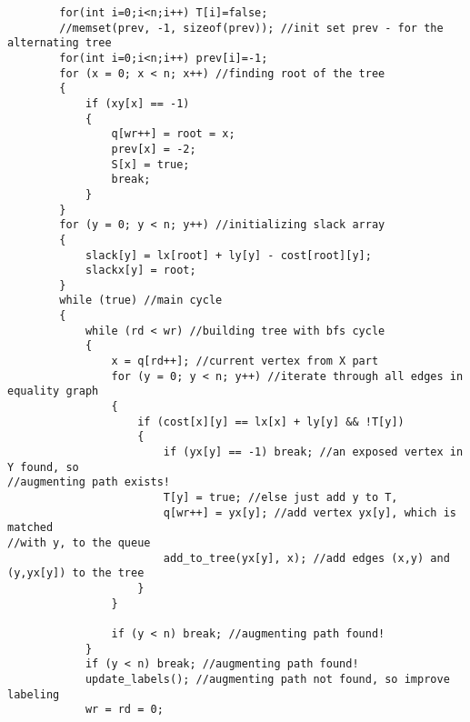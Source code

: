 \documentclass{article}
\begin{document}
\begin{multicols}{3}[]
\begin{verbatim}
        for(int i=0;i<n;i++) T[i]=false;
        //memset(prev, -1, sizeof(prev)); //init set prev - for the alternating tree
        for(int i=0;i<n;i++) prev[i]=-1;
        for (x = 0; x < n; x++) //finding root of the tree
        {
            if (xy[x] == -1)
            {
                q[wr++] = root = x;
                prev[x] = -2;
                S[x] = true;
                break;
            }
        }
        for (y = 0; y < n; y++) //initializing slack array
        {
            slack[y] = lx[root] + ly[y] - cost[root][y];
            slackx[y] = root;
        }
        while (true) //main cycle
        {
            while (rd < wr) //building tree with bfs cycle
            {
                x = q[rd++]; //current vertex from X part
                for (y = 0; y < n; y++) //iterate through all edges in equality graph
                {
                    if (cost[x][y] == lx[x] + ly[y] && !T[y])
                    {
                        if (yx[y] == -1) break; //an exposed vertex in Y found, so
//augmenting path exists!
                        T[y] = true; //else just add y to T,
                        q[wr++] = yx[y]; //add vertex yx[y], which is matched
//with y, to the queue
                        add_to_tree(yx[y], x); //add edges (x,y) and (y,yx[y]) to the tree
                    }
                }

                if (y < n) break; //augmenting path found!
            }
            if (y < n) break; //augmenting path found!
            update_labels(); //augmenting path not found, so improve labeling
            wr = rd = 0;


\end{verbatim}
\end{multicols}
\end{document}
